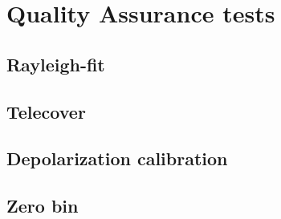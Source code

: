 \chapter{Quality Assurance tests}
\label{sect::devs01_chapter3}

\section{Rayleigh-fit}
\label{sect::devs01_chapter3_ray}

\section{Telecover}
\label{sect::devs01_chapter3_telecover}

\section{Depolarization calibration}
\label{sect::devs01_chapter3_depo}

\section{Zero bin}
\label{sect::devs01_chapter3_zerobin}